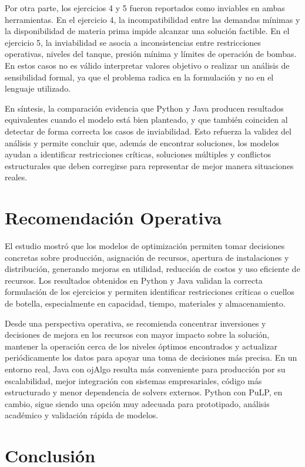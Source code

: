 \documentclass[12pt,a4paper]{article}
\begin{document}
Por otra parte, los ejercicios 4 y 5 fueron reportados como inviables en ambas herramientas. En el ejercicio 4, la incompatibilidad entre las demandas mínimas y la disponibilidad de materia prima impide alcanzar una solución factible. En el ejercicio 5, la inviabilidad se asocia a inconsistencias entre restricciones operativas, niveles del tanque, presión mínima y límites de operación de bombas. En estos casos no es válido interpretar valores objetivo o realizar un análisis de sensibilidad formal, ya que el problema radica en la formulación y no en el lenguaje utilizado.

En síntesis, la comparación evidencia que Python y Java producen resultados equivalentes cuando el modelo está bien planteado, y que también coinciden al detectar de forma correcta los casos de inviabilidad. Esto refuerza la validez del análisis y permite concluir que, además de encontrar soluciones, los modelos ayudan a identificar restricciones críticas, soluciones múltiples y conflictos estructurales que deben corregirse para representar de mejor manera situaciones reales.

\section{Recomendación Operativa}

El estudio mostró que los modelos de optimización permiten tomar decisiones concretas sobre producción, asignación de recursos, apertura de instalaciones y distribución, generando mejoras en utilidad, reducción de costos y uso eficiente de recursos. Los resultados obtenidos en Python y Java validan la correcta formulación de los ejercicios y permiten identificar restricciones críticas o cuellos de botella, especialmente en capacidad, tiempo, materiales y almacenamiento.

Desde una perspectiva operativa, se recomienda concentrar inversiones y decisiones de mejora en los recursos con mayor impacto sobre la solución, mantener la operación cerca de los niveles óptimos encontrados y actualizar periódicamente los datos para apoyar una toma de decisiones más precisa. En un entorno real, Java con ojAlgo resulta más conveniente para producción por su escalabilidad, mejor integración con sistemas empresariales, código más estructurado y menor dependencia de solvers externos. Python con PuLP, en cambio, sigue siendo una opción muy adecuada para prototipado, análisis académico y validación rápida de modelos.

\section{Conclusión}
\end{document}
